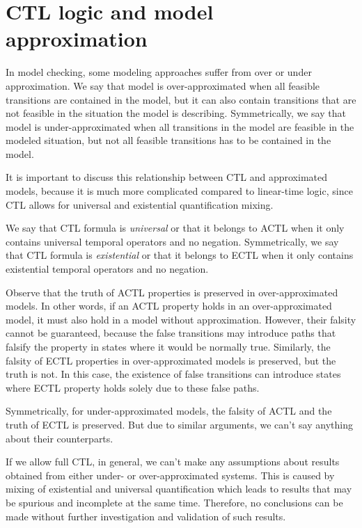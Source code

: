 \documentclass[12pt,oneside, draft]{fithesis2}
\begin{document}
		\section{CTL logic and model approximation}
		
			In model checking, some modeling approaches suffer from over or under approximation. We say that model is over-approximated when all feasible transitions are contained in the model, but it can also contain transitions that are not feasible in the situation the model is describing. Symmetrically, we say that model is under-approximated when all transitions in the model are feasible in the modeled situation, but not all feasible transitions has to be contained in the model. 
			
			It is important to discuss this relationship between CTL and approximated models, because it is much more complicated compared to linear-time logic, since CTL allows for universal and existential quantification mixing.
			
			We say that CTL formula is \emph{universal} or that it belongs to ACTL when it only contains universal temporal operators and no negation. Symmetrically, we say that CTL formula is \emph{existential} or that it belongs to ECTL when it only contains existential temporal operators and no negation.
			
			Observe that the truth of ACTL properties is preserved in over-approximated models. In other words, if an ACTL property holds in an over-approximated model, it must also hold in a model without approximation. However, their falsity cannot be guaranteed, because the false transitions may introduce paths that falsify the property in states where it would be normally true. Similarly, the falsity of ECTL properties in over-approximated models is preserved, but the truth is not. In this case, the existence of false transitions can introduce states where ECTL property holds solely due to these false paths.
			
			Symmetrically, for under-approximated models, the falsity of ACTL and the truth of ECTL is preserved. But due to similar arguments, we can't say anything about their counterparts.
			
			If we allow full CTL, in general, we can't make any assumptions about results obtained from either under- or over-approximated systems. This is caused by mixing of existential and universal quantification which leads to results that may be spurious and incomplete at the same time. Therefore, no conclusions can be made without further investigation and validation of such results.
			
\end{document}
